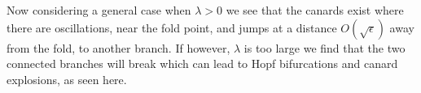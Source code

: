\documentclass[14pt, a0paper, portrait]{tikzposter}
\begin{document}
\begin{columns}
{%
Now considering a general case when $\lambda>0$ we see that the canards exist where there are oscillations, near the fold point, and jumps at a distance $O(\sqrt{\epsilon})$ away from the fold, to another branch. If however, $\lambda$ is too large we find that the two connected branches will break which can lead to Hopf bifurcations and canard explosions, as seen here.}



\end{columns}
\end{document}
